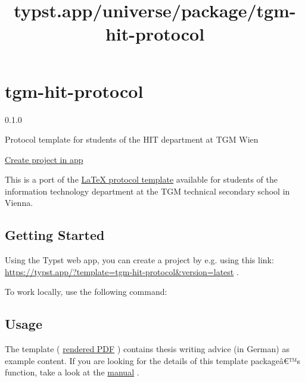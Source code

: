 \title{typst.app/universe/package/tgm-hit-protocol}

\label{banner}
\label{template-thumbnail}

\section{tgm-hit-protocol}\label{tgm-hit-protocol}

{ 0.1.0 }

Protocol template for students of the HIT department at TGM Wien

\href{/app?template=tgm-hit-protocol&version=0.1.0}{Create project in
app}

\label{readme}
This is a port of the
\href{https://github.com/TGM-HIT/latex-protocol/}{LaTeX protocol
template} available for students of the information technology
department at the TGM technical secondary school in Vienna.

\subsection{Getting Started}\label{getting-started}

Using the Typst web app, you can create a project by e.g. using this
link: \url{https://typst.app/?template=tgm-hit-protocol&version=latest}
.

To work locally, use the following command:

\begin{Shaded}
\begin{Highlighting}[]
\end{Highlighting}
\end{Shaded}

\subsection{Usage}\label{usage}

The template (
\href{https://github.com/typst/packages/raw/main/packages/preview/tgm-hit-protocol/0.1.0/main.pdf}{rendered
PDF} ) contains thesis writing advice (in German) as example content. If
you are looking for the details of this template packageâ€™s function,
take a look at the
\href{https://github.com/typst/packages/raw/main/packages/preview/tgm-hit-protocol/0.1.0/docs/manual.pdf}{manual}
.

